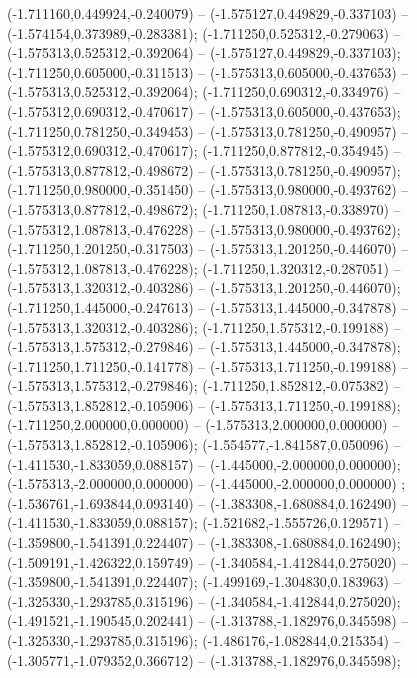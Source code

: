  (-1.711160,0.449924,-0.240079) -- (-1.575127,0.449829,-0.337103) -- (-1.574154,0.373989,-0.283381);
 (-1.711250,0.525312,-0.279063) -- (-1.575313,0.525312,-0.392064) -- (-1.575127,0.449829,-0.337103);
 (-1.711250,0.605000,-0.311513) -- (-1.575313,0.605000,-0.437653) -- (-1.575313,0.525312,-0.392064);
 (-1.711250,0.690312,-0.334976) -- (-1.575312,0.690312,-0.470617) -- (-1.575313,0.605000,-0.437653);
 (-1.711250,0.781250,-0.349453) -- (-1.575313,0.781250,-0.490957) -- (-1.575312,0.690312,-0.470617);
 (-1.711250,0.877812,-0.354945) -- (-1.575313,0.877812,-0.498672) -- (-1.575313,0.781250,-0.490957);
 (-1.711250,0.980000,-0.351450) -- (-1.575313,0.980000,-0.493762) -- (-1.575313,0.877812,-0.498672);
 (-1.711250,1.087813,-0.338970) -- (-1.575312,1.087813,-0.476228) -- (-1.575313,0.980000,-0.493762);
 (-1.711250,1.201250,-0.317503) -- (-1.575313,1.201250,-0.446070) -- (-1.575312,1.087813,-0.476228);
 (-1.711250,1.320312,-0.287051) -- (-1.575313,1.320312,-0.403286) -- (-1.575313,1.201250,-0.446070);
 (-1.711250,1.445000,-0.247613) -- (-1.575313,1.445000,-0.347878) -- (-1.575313,1.320312,-0.403286);
 (-1.711250,1.575312,-0.199188) -- (-1.575313,1.575312,-0.279846) -- (-1.575313,1.445000,-0.347878);
 (-1.711250,1.711250,-0.141778) -- (-1.575313,1.711250,-0.199188) -- (-1.575313,1.575312,-0.279846);
 (-1.711250,1.852812,-0.075382) -- (-1.575313,1.852812,-0.105906) -- (-1.575313,1.711250,-0.199188);
 (-1.711250,2.000000,0.000000) -- (-1.575313,2.000000,0.000000) -- (-1.575313,1.852812,-0.105906);
 (-1.554577,-1.841587,0.050096) -- (-1.411530,-1.833059,0.088157) -- (-1.445000,-2.000000,0.000000);
 (-1.575313,-2.000000,0.000000) -- (-1.445000,-2.000000,0.000000) ;
 (-1.536761,-1.693844,0.093140) -- (-1.383308,-1.680884,0.162490) -- (-1.411530,-1.833059,0.088157);
 (-1.521682,-1.555726,0.129571) -- (-1.359800,-1.541391,0.224407) -- (-1.383308,-1.680884,0.162490);
 (-1.509191,-1.426322,0.159749) -- (-1.340584,-1.412844,0.275020) -- (-1.359800,-1.541391,0.224407);
 (-1.499169,-1.304830,0.183963) -- (-1.325330,-1.293785,0.315196) -- (-1.340584,-1.412844,0.275020);
 (-1.491521,-1.190545,0.202441) -- (-1.313788,-1.182976,0.345598) -- (-1.325330,-1.293785,0.315196);
 (-1.486176,-1.082844,0.215354) -- (-1.305771,-1.079352,0.366712) -- (-1.313788,-1.182976,0.345598);

